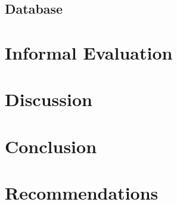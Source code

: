 \documentclass[12pt,titlepage]{article}
\begin{document}
  \subsection{Database}




\section{Informal Evaluation}


\section{Discussion}


\section{Conclusion}


\section{Recommendations}



\end{document}
